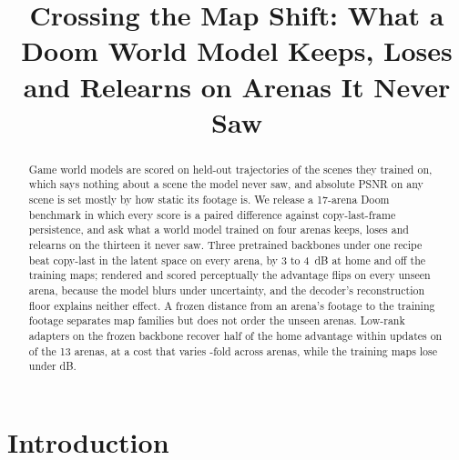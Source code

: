 \title{Crossing the Map Shift: What a Doom World Model Keeps, Loses and Relearns on Arenas It Never Saw}


\begin{abstract}
Game world models are scored on held-out trajectories of the scenes they trained on, which says nothing about a scene the model never saw, and absolute PSNR on any scene is set mostly by how static its footage is.
We release a 17-arena Doom benchmark in which every score is a paired difference against copy-last-frame persistence, and ask what a world model trained on four arenas keeps, loses and relearns on the thirteen it never saw.
Three pretrained backbones under one recipe beat copy-last in the latent space on every arena, by 3 to 4~dB at home and  off the training maps; rendered and scored perceptually the advantage flips on every unseen arena, because the model blurs under uncertainty, and the decoder's reconstruction floor explains neither effect. %
A frozen distance from an arena's footage to the training footage separates map families but does not order the unseen arenas.
Low-rank adapters on the frozen backbone recover half of the home advantage within  updates on  of the 13 arenas, at a cost that varies -fold across arenas, while the training maps lose under  dB. %
\end{abstract}



\section{Introduction}
\label{sec:intro}

